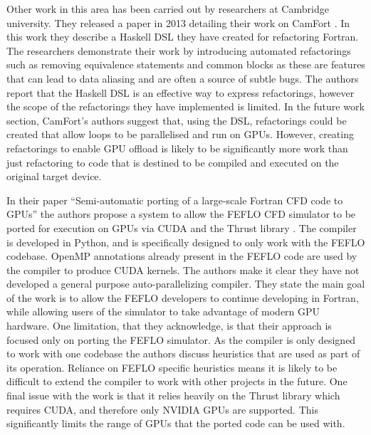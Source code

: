 \documentclass{mpaper}
\begin{document}
Other work in this area has been carried out by researchers at Cambridge university. They released a paper in 2013 detailing their work on CamFort \cite{Orchard2013}. In this work they describe a Haskell DSL they have created for refactoring Fortran. The researchers demonstrate their work by introducing automated refactorings such as removing equivalence statements and common blocks as these are features that can lead to data aliasing and are often a source of subtle bugs. The authors report that the Haskell DSL is an effective way to express refactorings, however the scope of the refactorings they have implemented is limited. In the future work section, CamFort's authors suggest that, using the DSL, refactorings could be created that allow loops to be parallelised and run on GPUs. However, creating refactorings to enable GPU offload is likely to be significantly more work than just refactoring to code that is destined to be compiled and executed on the original target device.

In their paper ``Semi-automatic porting of a large-scale Fortran CFD code to GPUs'' \cite{Corrigan2012} the authors propose a system to allow the FEFLO CFD simulator \cite{Lbhner2001} to be ported for execution on GPUs via CUDA and the Thrust library \cite{Library}. The compiler is developed in Python, and is specifically designed to only work with the FEFLO codebase. OpenMP \cite{OpenMP} annotations already present in the FEFLO code are used by the compiler to produce CUDA kernels. The authors make it clear they have not developed a general purpose auto-parallelizing compiler. They state the main goal of the work is to allow the FEFLO developers to continue developing in Fortran, while allowing users of the simulator to take advantage of modern GPU hardware. One limitation, that they acknowledge, is that their approach is focused only on porting the FEFLO simulator. As the compiler is only designed to work with one codebase the authors discuss heuristics that are used as part of its operation. Reliance on FEFLO specific heuristics means it is likely to be difficult to extend the compiler to work with other projects in the future. One final issue with the work is that it relies heavily on the Thrust library which requires CUDA, and therefore only NVIDIA GPUs are supported. This significantly limits the range of GPUs that the ported code can be used with.
\end{document}
